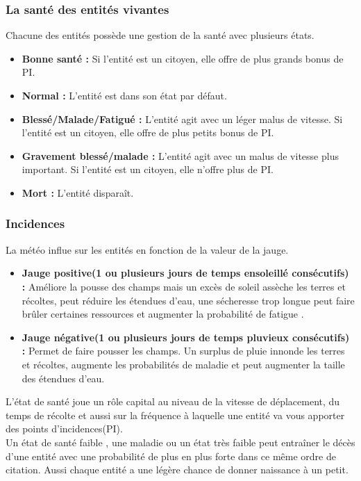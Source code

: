 \documentclass[a4paper]{article}
\newcommand{\alinea}{\hspace*{0.5cm}}
\begin{document}
				\subsubsection{La santé des entités vivantes}
					\alinea Chacune des entités possède une gestion de la santé avec plusieurs états.
					\begin{itemize} \small
						\item \textbf{Bonne santé :} Si l'entité est un citoyen, elle offre de plus grands bonus de PI.
						\item \textbf{Normal :} L'entité est dans son état par défaut.
						\item \textbf{Blessé/Malade/Fatigué :} L'entité agit avec un léger malus de vitesse. Si l'entité est un citoyen, elle offre de plus petits bonus de PI.
						\item \textbf{Gravement blessé/malade :} L'entité agit avec un malus de vitesse plus important. Si l'entité est un citoyen, elle n'offre plus de PI.
						\item \textbf{Mort :} L'entité disparaît.
					\end{itemize} \normalsize
			\subsubsection{Incidences}

\label{IncidenceE}
\alinea La météo influe sur les entités en fonction de la valeur de la jauge.
\begin{itemize} \small
		\item \textbf{Jauge positive(1 ou plusieurs jours de temps ensoleillé consécutifs) :} Améliore la pousse des champs mais un excès de soleil assèche les terres et récoltes, peut réduire les étendues d'eau, une sécheresse trop longue peut faire brûler certaines ressources et augmenter la probabilité de fatigue .
		\item \textbf{Jauge négative(1 ou plusieurs jours de temps pluvieux consécutifs) :} Permet de faire pousser les champs. Un surplus de pluie innonde les terres et récoltes, augmente les probabilités de maladie et peut augmenter la taille des étendues d'eau.
	  \end{itemize} \normalsize

L'état de santé joue un rôle capital au niveau de la vitesse de déplacement, du temps de récolte et aussi sur la fréquence à laquelle une entité va vous apporter des points d'incidences(PI).\\
	  	  \alinea  Un état de santé faible , une maladie ou un état très faible peut entraîner le décès  d'une entité avec une probabilité de plus en plus forte dans ce même ordre de citation.	  
Aussi chaque entité a une légère chance de donner naissance à un petit.
			
\end{document}

